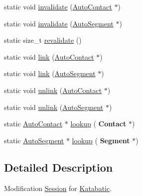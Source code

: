 \begin{DoxyCompactItemize}
\item 
static void \hyperlink{classKatabatic_1_1Session_a1f8da0ae3a9d714c1dfae69904acec5f}{invalidate} (\hyperlink{classKatabatic_1_1AutoContact}{Auto\+Contact} $\ast$)
\item 
static void \hyperlink{classKatabatic_1_1Session_a7968875ccb5abb2c6f6d5dec92027550}{invalidate} (\hyperlink{classKatabatic_1_1AutoSegment}{Auto\+Segment} $\ast$)
\item 
static size\+\_\+t \hyperlink{classKatabatic_1_1Session_a4da9e28432c1fdb0c754717487d9cc83}{revalidate} ()
\item 
static void \hyperlink{classKatabatic_1_1Session_a8fad7191a9fc248f84e71cf1c9d0c6be}{link} (\hyperlink{classKatabatic_1_1AutoContact}{Auto\+Contact} $\ast$)
\item 
static void \hyperlink{classKatabatic_1_1Session_ab12ddab837097ec298ede4f66302b677}{link} (\hyperlink{classKatabatic_1_1AutoSegment}{Auto\+Segment} $\ast$)
\item 
static void \hyperlink{classKatabatic_1_1Session_a10c42636ea5786d898d530905ccb30d6}{unlink} (\hyperlink{classKatabatic_1_1AutoContact}{Auto\+Contact} $\ast$)
\item 
static void \hyperlink{classKatabatic_1_1Session_ab815a7824e0253142af6b8a204c361ec}{unlink} (\hyperlink{classKatabatic_1_1AutoSegment}{Auto\+Segment} $\ast$)
\item 
static \hyperlink{classKatabatic_1_1AutoContact}{Auto\+Contact} $\ast$ \hyperlink{classKatabatic_1_1Session_acc20c1f675cc59f9a0068aba727eca47}{lookup} (\textbf{ Contact} $\ast$)
\item 
static \hyperlink{classKatabatic_1_1AutoSegment}{Auto\+Segment} $\ast$ \hyperlink{classKatabatic_1_1Session_a6e465f0a592fee7e1e45b6c825b8a5da}{lookup} (\textbf{ Segment} $\ast$)
\end{DoxyCompactItemize}


\subsection{Detailed Description}
Modification \hyperlink{classKatabatic_1_1Session}{Session} for \hyperlink{namespaceKatabatic}{Katabatic}. 

